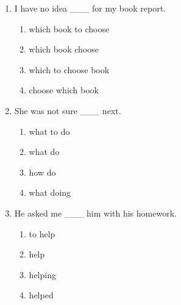 \documentclass[11pt,a4paper]{ctexart}
\begin{document}
\begin{enumerate}[leftmargin=*,itemsep=4pt]
\begin{enumerate}[label=\Alph*.,leftmargin=2em,itemsep=1pt,topsep=2pt]
\item where going
\item to where go
\end{enumerate}
\item I have no idea \_\_\_ for my book report.
\begin{enumerate}[label=\Alph*.,leftmargin=2em,itemsep=1pt,topsep=2pt]
\item which book to choose
\item which book choose
\item which to choose book
\item choose which book
\end{enumerate}
\item She was not sure \_\_\_ next.
\begin{enumerate}[label=\Alph*.,leftmargin=2em,itemsep=1pt,topsep=2pt]
\item what to do
\item what do
\item how do
\item what doing
\end{enumerate}
\item He asked me \_\_\_ him with his homework.
\begin{enumerate}[label=\Alph*.,leftmargin=2em,itemsep=1pt,topsep=2pt]
\item to help
\item help
\item helping
\item helped
\end{enumerate}
\end{enumerate}
\end{document}
